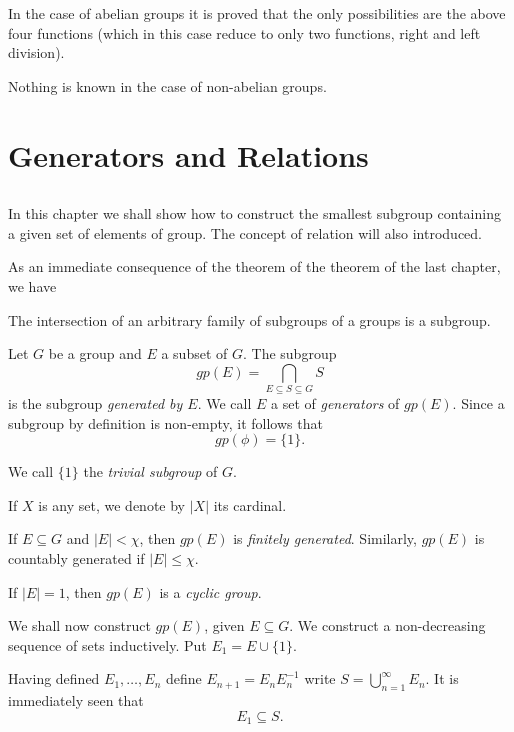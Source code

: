 In the case of abelian groups it is proved that the only possibilities
are the above four functions (which in this case reduce to only two
functions, right and left division). 

Nothing is known in the case of non-abelian groups.

\chapter{Generators and Relations} %

\section{} %

In this chapter we shall show how to construct the smallest subgroup
containing a given set of elements of group. The concept of relation
will also introduced.  

As an immediate consequence of the theorem of the theorem of the last
chapter, we have 

\setcounter{Theorem}{0}
\begin{Theorem} %
  The intersection of an arbitrary family of subgroups of a groups is
  a subgroup. 
\end{Theorem} 
 
 Let $G$ be a group and $E$ a subset of $G$. The subgroup
 $$
 gp (E) = \bigcap_{E \subseteq S \subseteq G}S
 $$
 is the subgroup \textit{generated by $E$}. We call $E$ a set of
 \textit {generators} of $gp (E)$. Since a subgroup by definition is
 non-empty, it follows that 
 $$
 gp (\phi) = \{1 \}.
 $$ 
 
 We call $\{1 \}$ the \textit{trivial subgroup} of $G$.
 
 If $X$ is any set, we denote by $|X|$ its cardinal.
 
 If $E \subseteq G$ and $|E| < \chi$, then $gp(E)$ is
 \textit{finitely generated}. Similarly, $gp(E)$ is countably
 generated if $|E| \leq \chi$. 
 
 If $|E| = 1$, then $gp(E)$ is a \textit{cyclic group}.
 
 We shall now construct $gp(E)$, given $E \subseteq G$. We construct a
 non-decreasing sequence of sets inductively. Put $E_1 = E \cup
 \{1\}$. 

 Having defined $E_1, \ldots, E_n$ define $E_{n+1} = E_n E^{-1}_{n}$
 write $S = \bigcup\limits_{n=1}^{\infty} E_n$. It is immediately seen
 that 
 $$
 E_1 \subseteq S. 
 $$
 
